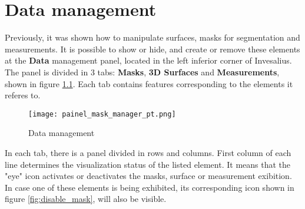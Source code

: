 \chapter{Data management}


Previously, it was shown how to manipulate surfaces, masks for segmentation and measurements. It is possible to show or
hide, and create or remove these elements at the \textbf{Data} management panel, located in the left inferior corner of
Invesalius. The panel is divided in 3 tabs: \textbf{Masks}, \textbf{3D Surfaces} and \textbf{Measurements}, shown in
figure \ref{fig:volumetric_data}. Each tab contains features corresponding to the elements it referes to.


\begin{figure}[!htb]
\centering
\texttt{[image: painel\_mask\_manager\_pt.png]}
\caption{Data management}
\label{fig:volumetric_data}
\end{figure}


In each tab, there is a panel divided in rows and columns. First column of each line determines the visualization status
of the listed element. It means that the "eye" icon activates or deactivates the masks, surface or measurement exibition.
In case one of these elements is being exhibited, its corresponding icon shown in figure \ref{fig:disable_mask}, will
also be visible.

